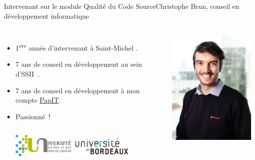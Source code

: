 \documentclass{beamer}
\begin{document}
    \begin{frame}{Intervenant sur le module Qualité du Code Source}{Christophe Brun, conseil en développement informatique}

        \begin{columns}
            \begin{itemize}
                \item 1\textsuperscript{ere} année d'intervenant à Saint-Michel .

                \item 7 ans de conseil en développement au sein d'SSII~.

                \item 7 ans de conseil en développement à mon compte \href{https://papit.fr}{PapIT}.

                \item Passionné~!
                \bigbreak
                \begin{columns}
                    \centering
                    \includegraphics[width=3cm]{image/logo-uppa}
                    \centering
                    \includegraphics[width=3cm]{image/logo-universite-bordeaux}
                \end{columns}
            \end{itemize}
            \centering
            \includegraphics[width=5cm]{image/trombine-christophe}
        \end{columns}
    \end{frame}
\end{document}
